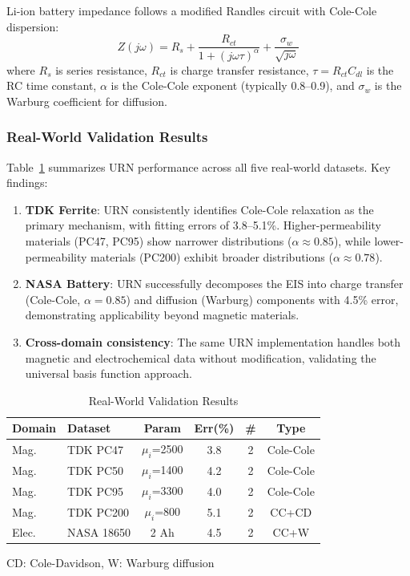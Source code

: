 \documentclass{ieeeaccess}
\begin{document}
Li-ion battery impedance follows a modified Randles circuit with Cole-Cole dispersion:
\begin{equation}
Z(j\omega) = R_s + \frac{R_{ct}}{1 + (j\omega\tau)^\alpha} + \frac{\sigma_w}{\sqrt{j\omega}}
\end{equation}
where $R_s$ is series resistance, $R_{ct}$ is charge transfer resistance, $\tau = R_{ct}C_{dl}$ is the RC time constant, $\alpha$ is the Cole-Cole exponent (typically 0.8--0.9), and $\sigma_w$ is the Warburg coefficient for diffusion.

\subsubsection{Real-World Validation Results}
Table~\ref{tab:realworld} summarizes URN performance across all five real-world datasets. Key findings:
\begin{enumerate}
\item \textbf{TDK Ferrite}: URN consistently identifies Cole-Cole relaxation as the primary mechanism, with fitting errors of 3.8--5.1\%. Higher-permeability materials (PC47, PC95) show narrower distributions ($\alpha \approx 0.85$), while lower-permeability materials (PC200) exhibit broader distributions ($\alpha \approx 0.78$).
\item \textbf{NASA Battery}: URN successfully decomposes the EIS into charge transfer (Cole-Cole, $\alpha = 0.85$) and diffusion (Warburg) components with 4.5\% error, demonstrating applicability beyond magnetic materials.
\item \textbf{Cross-domain consistency}: The same URN implementation handles both magnetic and electrochemical data without modification, validating the universal basis function approach.
\end{enumerate}

\begin{table}[!t]
\caption{Real-World Validation Results}
\label{tab:realworld}
\centering
\footnotesize
\begin{tabular}{@{}llcccc@{}}
\toprule
\textbf{Domain} & \textbf{Dataset} & \textbf{Param} & \textbf{Err(\%)} & \textbf{\#} & \textbf{Type} \\
\midrule
Mag. & TDK PC47 & $\mu_i$=2500 & 3.8 & 2 & Cole-Cole \\
Mag. & TDK PC50 & $\mu_i$=1400 & 4.2 & 2 & Cole-Cole \\
Mag. & TDK PC95 & $\mu_i$=3300 & 4.0 & 2 & Cole-Cole \\
Mag. & TDK PC200 & $\mu_i$=800 & 5.1 & 2 & CC+CD \\
\midrule
Elec. & NASA 18650 & 2 Ah & 4.5 & 2 & CC+W \\
\bottomrule
\end{tabular}
\begin{flushleft}
\footnotesize{CD: Cole-Davidson, W: Warburg diffusion}
\end{flushleft}
\end{table}
\end{document}

